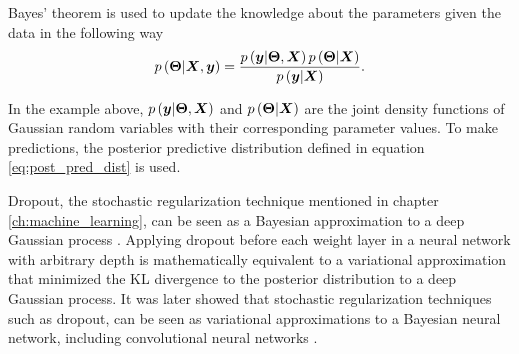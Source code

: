 

Bayes' theorem is used to update the knowledge about the parameters given the data in the following way
\begin{equation}
  p\left( \boldsymbol{\Theta} | \boldsymbol{X}, \boldsymbol{y} \right) = \frac{p\left( \boldsymbol{y} | \boldsymbol{\Theta}, \boldsymbol{X} \right) p\left( \boldsymbol{\Theta} | \boldsymbol{X} \right)}{p\left( \boldsymbol{y} | \boldsymbol{X} \right)}.
\end{equation}

In the example above, $p\left( \boldsymbol{y} | \boldsymbol{\Theta}, \boldsymbol{X} \right)$ and $p\left( \boldsymbol{\Theta} | \boldsymbol{X} \right)$ are the joint density functions of Gaussian random variables with their corresponding parameter values. To make predictions, the posterior predictive distribution defined in equation \eqref{eq:post_pred_dist} is used.

Dropout, the stochastic regularization technique mentioned in chapter \ref{ch:machine_learning}, can be seen as a Bayesian approximation to a deep Gaussian process \cite{gal2015dropout} \cite{gal2015dropout1}. Applying dropout before each weight layer in a neural network with arbitrary depth is mathematically equivalent to a variational approximation that minimized the KL divergence to the posterior distribution to a deep Gaussian process. It was later showed that stochastic regularization techniques such as dropout, can be seen as variational approximations to a Bayesian neural network, including convolutional neural networks \cite{gal2015bayesian} \cite{gal2015modern}.




